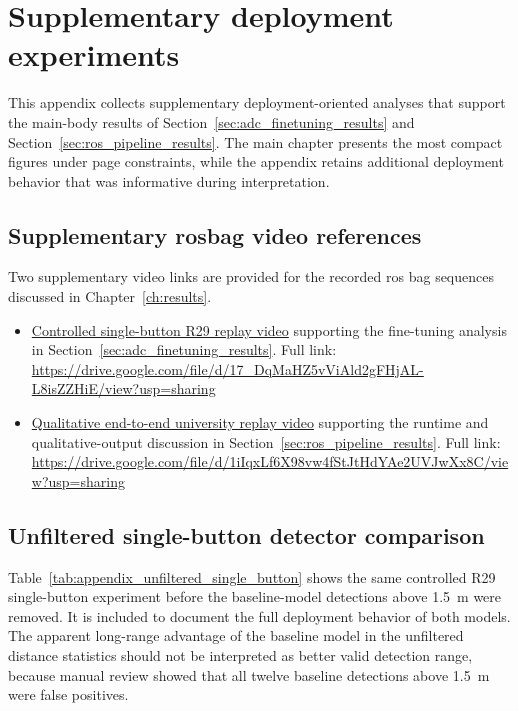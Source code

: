 \chapter{Supplementary deployment experiments}
\label{app:adc_replay_appendix}

This appendix collects supplementary deployment-oriented analyses that support the
main-body results of Section~\ref{sec:adc_finetuning_results} and
Section~\ref{sec:ros_pipeline_results}. The main chapter presents the most
compact figures under page constraints, while the appendix retains additional
deployment behavior that was informative during interpretation.


\section{Supplementary rosbag video references}
\label{app:rosbag_video_refs}

Two supplementary video links are provided for the recorded \gls{ros} bag
sequences discussed in Chapter~\ref{ch:results}.

\begin{itemize}
    \item \href{\detokenize{https://drive.google.com/file/d/17_DqMaHZ5vViAld2gFHjAL-L8isZZHiE/view?usp=sharing}}{Controlled single-button R29 replay video} supporting the  fine-tuning analysis in Section~\ref{sec:adc_finetuning_results}. Full link: \url{https://drive.google.com/file/d/17_DqMaHZ5vViAld2gFHjAL-L8isZZHiE/view?usp=sharing}
    \item \href{\detokenize{https://drive.google.com/file/d/1iIqxLf6X98vw4fStJtHdYAe2UVJwXx8C/view?usp=sharing}}{Qualitative end-to-end university replay video} supporting the runtime and qualitative-output discussion in Section~\ref{sec:ros_pipeline_results}. Full link: \url{https://drive.google.com/file/d/1iIqxLf6X98vw4fStJtHdYAe2UVJwXx8C/view?usp=sharing}
\end{itemize}

\section{Unfiltered single-button detector comparison}

Table~\ref{tab:appendix_unfiltered_single_button} shows the same controlled R29
single-button experiment before the baseline-model detections above 1.5~m were
removed. It is included to document the full deployment behavior of both models.
The apparent long-range advantage of the baseline model in the unfiltered distance
statistics should not be interpreted as better valid detection range, because manual
review showed that all twelve baseline detections above 1.5~m were false positives.


